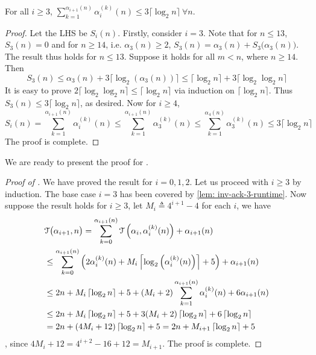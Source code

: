 \begin{lem}
	For all $i\ge 3$, $\displaystyle \sum_{k=1}^{\alpha_{i+1}(n)} \alpha_i^{(k)}(n) \le 3\big\lceil \log_2n \big\rceil \ \forall n$.
\end{lem}
\begin{proof}
	Let the LHS be $S_i(n)$. Firstly, consider $i = 3$. Note that for $n\le 13$, $S_3(n) = 0$ and for $n\ge 14$, i.e. $\alpha_3(n)\ge 2$, $S_3(n) = \alpha_3(n) + S_3\big(\alpha_3(n)\big)$. The result thus holds for $n\le 13$. Suppose it holds for all $m < n$, where $n\ge 14$. Then
	\begin{equation*}
	S_3(n) \le \alpha_3(n) + 3\big\lceil \log_2(\alpha_3(n)) \big\rceil \le \big\lceil \log_2n \big\rceil + 3\big\lceil \log_2\log_2n \big\rceil
	\end{equation*}
	It is easy to prove $2\big\lceil \log_2\log_2n \big\rceil \le \big\lceil \log_2n \big\rceil$ via induction on $\big\lceil \log_2n \big\rceil$. Thus $S_3(n)\le 3\big\lceil \log_2n \big\rceil$, as desired. Now for $i \ge 4$,
	\begin{equation*}
	S_i(n) = \sum_{k=1}^{\alpha_{i+1}(n)} \alpha_i^{(k)}(n) \le
	\sum_{k=1}^{\alpha_{i+1}(n)} \alpha_3^{(k)}(n) \le
	\sum_{k=1}^{\alpha_{4}(n)} \alpha_3^{(k)}(n) \le 3\big\lceil \log_2n \big\rceil
	\end{equation*}
	The proof is complete.	
\end{proof}
We are ready to present the proof for .
\begin{proof}[Proof of ]
	We have proved the result for $i = 0, 1, 2$. Let us proceed with $i\ge 3$ by induction. The base case $i = 3$ has been covered by \cref{lem: inv-ack-3-runtime}. Now suppose the result holds for $i\ge 3$, let $M_i\triangleq 4^{i+1}-4$ for each $i$, we have
	\begin{equation*}
	\begin{aligned}
	& \mathcal{T}\big(\alpha_{i+1}, n\big) = \sum_{k=0}^{\alpha_{i+1}(n)} \mathcal{T}\left(\alpha_i, \alpha_i^{(k)}(n)\right) + \alpha_{i+1}(n) \\
	& \le \sum_{k=0}^{\alpha_{i+1}(n)}\left(2\alpha_i^{(k)}(n) + M_i\left\lceil\log_2\left(\alpha_i^{(k)}(n)\right)\right\rceil + 5 \right) + \alpha_{i+1}(n) \\
	& \le 2n + M_i\left\lceil\log_2n\right\rceil + 5 + (M_i+2)\sum_{k=1}^{\alpha_{i+1}(n)}\alpha_i^{(k)}(n) + 6\alpha_{i+1}(n) \\
	& \le 2n + M_i\left\lceil\log_2n\right\rceil + 5 +
	3(M_i + 2)\left\lceil\log_2n\right\rceil + 6\left\lceil\log_2n\right\rceil \\
	& = 2n + (4M_i + 12)\left\lceil\log_2n\right\rceil + 5 = 2n + M_{i+1}\left\lceil\log_2n\right\rceil + 5
	\end{aligned}
	\end{equation*}
	, since $4M_i + 12 = 4^{i+2} - 16 + 12 = M_{i+1}$. The proof is complete.
\end{proof}
